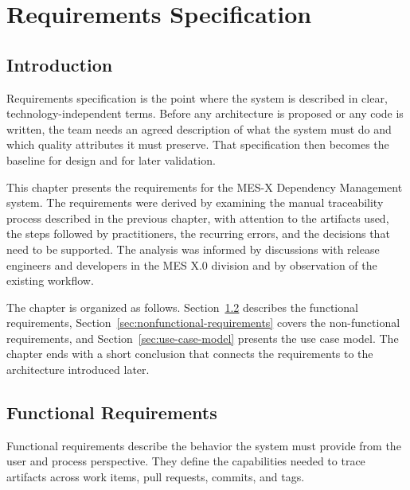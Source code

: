 
\chapter{Requirements Specification}
\label{chap:requirements}

\section{Introduction}
\label{sec:req-intro}

Requirements specification is the point where the system is described in clear,
technology-independent terms. Before any architecture is proposed or any code
is written, the team needs an agreed description of what the system must do and
which quality attributes it must preserve. That specification then becomes the
baseline for design and for later validation.

This chapter presents the requirements for the MES-X Dependency Management
system. The requirements were derived by examining the manual traceability
process described in the previous chapter, with attention to the artifacts used,
the steps followed by practitioners, the recurring errors, and the decisions
that need to be supported. The analysis was informed by discussions with
release engineers and developers in the MES X.0 division and by observation of
the existing workflow.

The chapter is organized as follows. Section~\ref{sec:functional-requirements}
describes the functional requirements, Section~\ref{sec:nonfunctional-requirements}
covers the non-functional requirements, and Section~\ref{sec:use-case-model}
presents the use case model. The chapter ends with a short conclusion that
connects the requirements to the architecture introduced later.

\section{Functional Requirements}
\label{sec:functional-requirements}

Functional requirements describe the behavior the system must provide from the
user and process perspective. They define the capabilities needed to trace
artifacts across work items, pull requests, commits, and tags.

